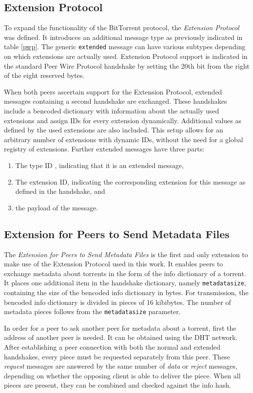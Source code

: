 \documentclass[10pt, a4paper, twoside, headsepline]{scrbook}
\renewcommand{\_}{\origunderscore\allowbreak}
\begin{document}
\subsection{Extension Protocol}
\label{ep}
To expand the functionality of the BitTorrent protocol, the \emph{Extension Protocol} \cite{bep10} was defined. It introduces an additional message type as previously indicated in table \ref{pwp}. The generic \texttt{extended} message can have various subtypes depending on which extensions are actually used. Extension Protocol support is indicated in the standard Peer Wire Protocol handshake by setting the 20th bit from the right of the eight reserved bytes.

When both peers ascertain support for the Extension Protocol, extended messages containing a second handshake are exchanged. These handshakes include a bencoded dictionary with information about the actually used extensions and assign IDs for every extension dynamically. Additional values as defined by the used extensions are also included. This setup allows for an arbitrary number of extensions with dynamic IDs, without the need for a global registry of extensions. Further extended messages have three parts:
\begin{enumerate}
  \item The type ID , indicating that it is an extended message,
  \item The extension ID, indicating the corresponding extension for this message as defined in the handshake, and
  \item the payload of the message.
\end{enumerate}

\subsection{Extension for Peers to Send Metadata Files}
\label{ext-meta}
The \emph{Extension for Peers to Send Metadata Files} \cite{bep9} is the first and only extension to make use of the Extension Protocol used in this work. It enables peers to exchange metadata about torrents in the form of the info dictionary of a torrent. It places one additional item in the handshake dictionary, namely \texttt{metadata\_size}, containing the size of the bencoded info dictionary in bytes. For transmission, the bencoded info dictionary is divided in pieces of 16 kibibytes. The number of metadata pieces follows from the \texttt{metadata\_size} parameter.

In order for a peer to ask another peer for metadata about a torrent, first the address of another peer is needed. It can be obtained using the DHT network. After establishing a peer connection with both the normal and extended handshakes, every piece must be requested separately from this peer. These \emph{request} messages are answered by the same number of \emph{data} or \emph{reject} messages, depending on whether the opposing client is able to deliver the piece. When all pieces are present, they can be combined and checked against the info hash.
\end{document}
